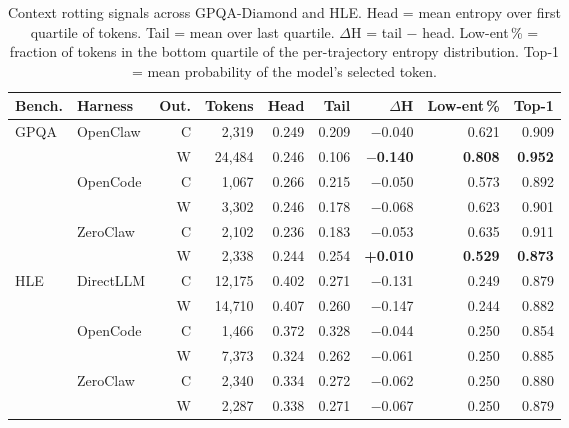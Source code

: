 \begin{table}[t]
\centering
\small
\caption{%
  Context rotting signals across GPQA-Diamond and HLE.
  Head = mean entropy over first quartile of tokens.
  Tail = mean over last quartile.
  $\Delta$H = tail $-$ head.
  Low-ent\,\% = fraction of tokens in the bottom quartile of the
  per-trajectory entropy distribution.
  Top-1 = mean probability of the model's selected token.
}
\label{tab:cross-rotting}
\setlength{\tabcolsep}{3pt}
\begin{tabular}{llrrrrrrr}
\toprule
Bench. & Harness & Out. & Tokens & Head & Tail & $\Delta$H & Low-ent\,\% & Top-1 \\
\midrule
\multirow{6}{*}{GPQA}
& \multirow{2}{*}{OpenClaw}
  & C &  2{,}319 & 0.249 & 0.209 & $-$0.040 & 0.621 & 0.909 \\
& & W & 24{,}484 & 0.246 & 0.106 & \textbf{$-$0.140} & \textbf{0.808} & \textbf{0.952} \\
\cmidrule{2-9}
& \multirow{2}{*}{OpenCode}
  & C & 1{,}067 & 0.266 & 0.215 & $-$0.050 & 0.573 & 0.892 \\
& & W & 3{,}302 & 0.246 & 0.178 & $-$0.068 & 0.623 & 0.901 \\
\cmidrule{2-9}
& \multirow{2}{*}{ZeroClaw}
  & C & 2{,}102 & 0.236 & 0.183 & $-$0.053 & 0.635 & 0.911 \\
& & W & 2{,}338 & 0.244 & 0.254 & \textbf{+0.010} & \textbf{0.529} & \textbf{0.873} \\
\midrule
\multirow{6}{*}{HLE}
& \multirow{2}{*}{DirectLLM}
  & C & 12{,}175 & 0.402 & 0.271 & $-$0.131 & 0.249 & 0.879 \\
& & W & 14{,}710 & 0.407 & 0.260 & $-$0.147 & 0.244 & 0.882 \\
\cmidrule{2-9}
& \multirow{2}{*}{OpenCode}
  & C &  1{,}466 & 0.372 & 0.328 & $-$0.044 & 0.250 & 0.854 \\
& & W &  7{,}373 & 0.324 & 0.262 & $-$0.061 & 0.250 & 0.885 \\
\cmidrule{2-9}
& \multirow{2}{*}{ZeroClaw}
  & C &  2{,}340 & 0.334 & 0.272 & $-$0.062 & 0.250 & 0.880 \\
& & W &  2{,}287 & 0.338 & 0.271 & $-$0.067 & 0.250 & 0.879 \\
\bottomrule
\end{tabular}
\end{table}


